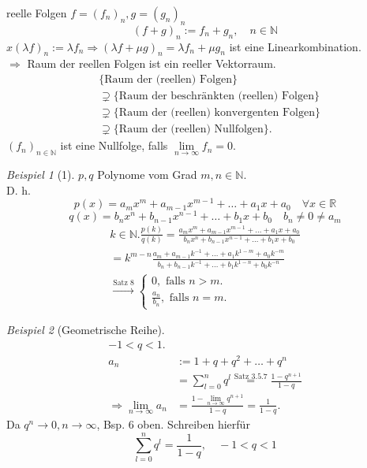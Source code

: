 \documentclass[12pt,a4paper,titlepage]{article} %
\theoremstyle{definition}
\theoremstyle{remark}
\newtheorem*{bsp}{Beispiel}
\newcommand{\N}{\mathbb{N}}
\newcommand{\R}{\mathbb{R}}
\newcommand{\limes}[1]{\lim\limits_{#1\rightarrow\infty}}
\begin{document}
reelle Folgen \(f = (f_n)_n, g = (g_n)_n  \)\\
\[ (f+g)_n := f_n + g_n, \quad n\in\N \]
\(x (\lambda f)_n := \lambda f_n \Rightarrow ( \lambda f + \mu g )_n = \lambda f_n + \mu g_n \) ist eine Linearkombination.\\
\(\Rightarrow\) Raum der reellen Folgen ist ein reeller Vektorraum.
\begin{align*}
	&\{ \text{Raum der (reellen) Folgen} \}\\
	&\supsetneq \{ \text{Raum der beschränkten (reellen) Folgen} \}\\
	&\supsetneq \{ \text{Raum der (reellen) konvergenten Folgen} \}\\
	&\supsetneq \{ \text{Raum der (reellen) Nullfolgen} \}.
\end{align*}
\((f_n)_{n\in\N}\) ist eine Nullfolge, falls \( \limes{n} f_n = 0 \).
\begin{bsp}[1]
	\(p,q\) Polynome vom Grad \(m,n\in\N\).\\
	D. h. \[ p(x) = a_m x^m + a_{m-1} x^{m-1} + \ldots + a_1 x + a_0 \quad \forall x\in\R \]
	\[q(x) = b_n x^n + b_{n-1} x^{n-1} + \ldots + b_1 x + b_0 \quad b_n \neq 0 \neq a_m \]
	\begin{align*}
		k\in\N. \frac{p(k)}{q(k)} = \frac{a_m x^m + a_{m-1} x^{m-1} + \ldots + a_1 x + a_0}{b_n x^n + b_{n-1} x^{n-1} + \ldots + b_1 x + b_0}\\
		= k^{m-n} \frac{a_m + a_{m-1} k^{-1} + \ldots + a_1 k^{1-m} + a_0 k^{-m} }{b_n + b_{n-1} k^{-1} + \ldots + b_1 k^{1-n} + b_0 k^{-n}}\\
		\overset{\text{Satz 8}}{\longrightarrow}
		\begin{cases}
			0, \text{ falls } n>m.\\
			\frac{a_n}{b_n}, \text{ falls } n = m.
		\end{cases}
	\end{align*}
\end{bsp}
\begin{bsp}[Geometrische Reihe]
	\begin{align*}
		-1<q<1.\\
		a_n &:= 1 + q + q^2 + \ldots + q^n\\
		&= \sum_{l=0}^{n} q^l \overset{\text{Satz 3.5.7}}{=} \frac{1-q^{n+1}}{1-q}\\
		\Rightarrow \limes{n} a_n &= \frac{1- \limes{n} q^{n+1}}{1-q} = \frac{1}{1-q}.
	\end{align*}
	Da \(q^n \rightarrow 0, n\rightarrow\infty \), Bsp. 6 oben.
	Schreiben hierfür \[ \sum_{l=0}^{n} q^l = \frac{1}{1-q}, \quad -1<q<1 \]
\end{bsp}
\end{document}

